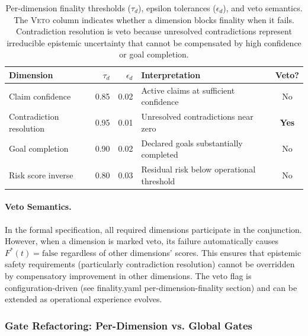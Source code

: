 \documentclass[11pt]{article}
\begin{document}
\begin{table}[H]
\centering
\small
\begin{tabular}{lrrl|c}
\toprule
\textbf{Dimension} & $\tau_d$ & $\epsilon_d$ & \textbf{Interpretation} & \textbf{Veto?} \\
\midrule
Claim confidence & 0.85 & 0.02 & Active claims at sufficient confidence & No \\
Contradiction resolution & 0.95 & 0.01 & Unresolved contradictions near zero & \textbf{Yes} \\
Goal completion & 0.90 & 0.02 & Declared goals substantially completed & No \\
Risk score inverse & 0.80 & 0.03 & Residual risk below operational threshold & No \\
\bottomrule
\end{tabular}
\caption{Per-dimension finality thresholds ($\tau_d$), epsilon tolerances ($\epsilon_d$), and veto semantics.
The \textnormal{\textsc{Veto}} column indicates whether a dimension blocks finality when it fails.
Contradiction resolution is veto because unresolved contradictions represent irreducible epistemic uncertainty
that cannot be compensated by high confidence or goal completion.}
\label{tab:vector-finality-thresholds}
\end{table}

\paragraph{Veto Semantics.}
In the formal specification, all required dimensions participate in the conjunction. However, when
a dimension is marked veto, its failure automatically causes $F^*(t) = \text{false}$ regardless of other
dimensions' scores. This ensures that epistemic safety requirements (particularly contradiction resolution)
cannot be overridden by compensatory improvement in other dimensions. The veto flag is configuration-driven
(see finality.yaml per-dimension-finality section) and can be extended as operational experience evolves.

\subsubsection{Gate Refactoring: Per-Dimension vs. Global Gates}
\end{document}
